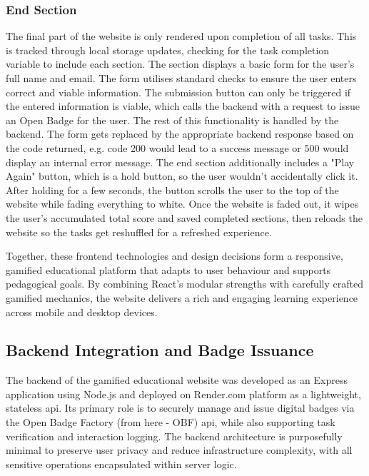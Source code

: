 \subsubsection{End Section}

The final part of the website is only rendered upon completion of all tasks. 
This is tracked through local storage updates, checking for the task completion variable to include each section.
The section displays a basic form for the user's full name and email. 
The form utilises standard checks to ensure the user enters correct and viable information.
The submission button can only be triggered if the entered information is viable, which calls the backend with a request to issue an Open Badge for the user. 
The rest of this functionality is handled by the backend. 
The form gets replaced by the appropriate backend response based on the code returned, e.g. code 200 would lead to a success message or 500 would display an internal error message.
The end section additionally includes a "Play Again" button, which is a hold button, so the user wouldn't accidentally click it. 
After holding for a few seconds, the button scrolls the user to the top of the website while fading everything to white. 
Once the website is faded out, it wipes the user's accumulated total score and saved completed sections, then reloads the website so the tasks get reshuffled for a refreshed experience.

Together, these frontend technologies and design decisions form a responsive, gamified educational platform that adapts to user behaviour and supports pedagogical goals. By combining React’s modular strengths with carefully crafted gamified mechanics, the website delivers a rich and engaging learning experience across mobile and desktop devices.

\subsection{Backend Integration and Badge Issuance}

The backend of the gamified educational website was developed as an Express application using Node.js and deployed on Render.com platform as a lightweight, stateless \acrshort{api}. 
Its primary role is to securely manage and issue digital badges via the Open Badge Factory (from here - OBF) \acrshort{api}, while also supporting task verification and interaction logging. 
The backend architecture is purposefully minimal to preserve user privacy and reduce infrastructure complexity, with all sensitive operations encapsulated within server logic.

